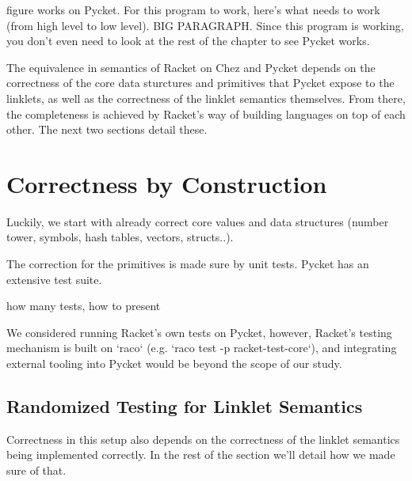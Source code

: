	\begin{paragraph-here}%
		figure works on Pycket. For this program to work, here's what needs to work (from high level to low level). BIG PARAGRAPH. Since this program is working, you don't even need to look at the rest of the chapter to see Pycket works.
	\end{paragraph-here}

	\begin{paragraph-here}%
		The equivalence in semantics of Racket on Chez and Pycket depends on the correctness of the core data sturctures and primitives that Pycket expose to the linklets, as well as the correctness of the linklet semantics themselves. From there, the completeness is achieved by Racket's way of building languages on top of each other. The next two sections detail these.
	\end{paragraph-here}

	\section[\texorpdfstring{Correctness by Construction}{Correctness}]{Correctness by Construction}


		\begin{paragraph-here}%
			Luckily, we start with already correct core values and data structures (number tower, symbols, hash tables, vectors, structs..).
		\end{paragraph-here}

		\begin{paragraph-here}%
			The correction for the primitives is made sure by unit tests. Pycket has an extensive test suite.
		\end{paragraph-here}

		\begin{todo}
			how many tests, how to present
		\end{todo}

		\begin{paragraph-here}%
			We considered running Racket's own tests on Pycket, however, Racket's testing mechanism is built on `raco` (e.g. `raco test -p racket-test-core`), and integrating external tooling into Pycket would be beyond the scope of our study.
		\end{paragraph-here}

		\subsection{Randomized Testing for Linklet Semantics}
			\begin{paragraph-here}%
				Correctness in this setup also depends on the correctness of the linklet semantics being implemented correctly. In the rest of the section we'll detail how we made sure of that.
			\end{paragraph-here}

